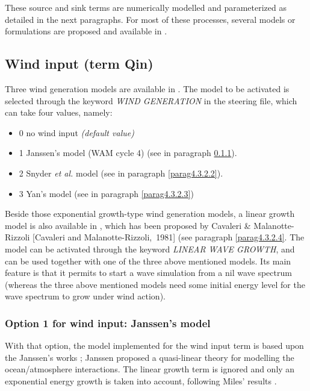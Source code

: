 These source and sink terms are numerically modelled and parameterized as detailed in the next paragraphs. For most of these processes, several models or formulations are proposed and available in \tomawac.


\subsection{ Wind input (term Qin)}

 Three wind generation models are available in \tomawac. The model to be activated is selected through the keyword \textit{WIND GENERATION} in the steering file, which can take four values, namely:

\begin{itemize}
\item  0 no wind input \textit{(default value)}
\item  1 Janssen's model \cite{Janssen1989} \cite{Janssen1991} (WAM cycle 4) (see in paragraph \ref{parag4.3.2.1}).
\item  2 Snyder \textit{et al. }model \cite{Snyder1981} (see in paragraph \ref{parag4.3.2.2}).
\item  3 Yan's model \cite{Yan1987} (see in paragraph \ref{parag4.3.2.3})
\end{itemize}

 Beside those exponential growth-type wind generation models, a linear growth model is also available in \tomawac, which has been proposed by Cavaleri \& Malanotte-Rizzoli [Cavaleri and Malanotte-Rizzoli,~1981] (see paragraph \ref{parag4.3.2.4}. The model can be activated through the keyword \textit{LINEAR WAVE GROWTH}, and can be used together with one of the three above mentioned models. Its main feature is that it permits to start a wave simulation from a nil wave spectrum (whereas the three above mentioned models need some initial energy level for the wave spectrum to grow under wind action).


  \subsubsection{Option 1 for wind input: Janssen's model}
\label{parag4.3.2.1}
 With that option, the model implemented for the wind input term is based upon the Janssen's works \cite{Janssen1989} \cite{Janssen1991}; Janssen proposed a quasi-linear theory for modelling the ocean/atmosphere interactions. The linear growth term is ignored and only an exponential energy growth is taken into account, following Miles' results \cite{Miles1957}.

